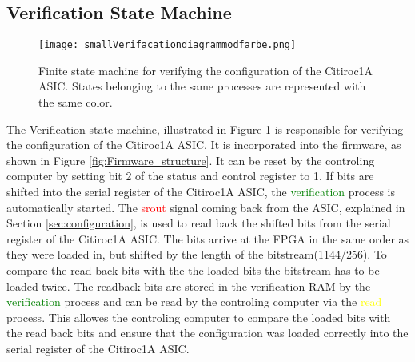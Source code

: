 \subsection{Verification State Machine}
\begin{figure}[H]
    \centering
    \texttt{[image: smallVerifacationdiagrammodfarbe.png]}%
    \caption{Finite state machine for verifying the configuration of the Citiroc1A ASIC.
    States belonging to the same processes are represented with the same color.}
    \label{fig:Verification_state_machine}
\end{figure}
The Verification state machine, illustrated in Figure \ref{fig:Verification_state_machine} is responsible for verifying the configuration of the Citiroc1A ASIC.
It is incorporated into the firmware, as shown in Figure \ref{fig:Firmware_structure}.
\newline
It can be reset by the controling computer by setting bit 2 of the status and control register to 1.
\newline
If bits are shifted into the serial register of the Citiroc1A ASIC, the \textcolor{green}{verification} process is automatically started.
The \textcolor{red}{srout} signal coming back from the ASIC, explained in Section \ref{sec:configuration}, is used to read back the shifted bits from the serial register of the Citiroc1A ASIC.
The bits arrive at the FPGA in the same order as they were loaded in, but shifted by the length of the bitstream(1144/256). To compare the read back bits with the the loaded bits the bitstream has to be loaded twice.
\newline
The readback bits are stored in the verification RAM by the \textcolor{green}{verification} process and can be read by the controling computer via the  \textcolor{yellow}{read} process.
This allowes the controling computer to compare the loaded bits with the read back bits and ensure that the configuration was loaded correctly into the serial register of the Citiroc1A ASIC.
